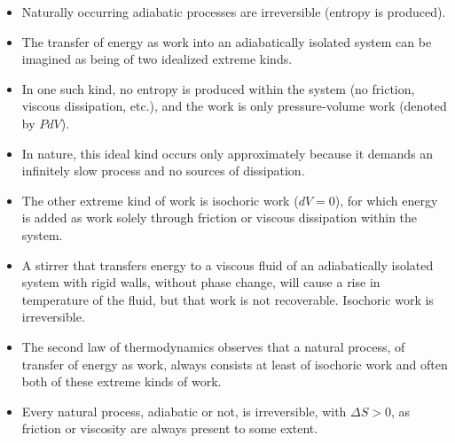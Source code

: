 \documentclass[]{article}
\begin{document}
\begin{itemize}
\item Naturally occurring adiabatic processes are irreversible (entropy is produced).
\item The transfer of energy as work into an adiabatically isolated system can be imagined as being of two idealized extreme kinds.
\item In one such kind, no entropy is produced within the system (no friction, viscous dissipation, etc.), and the work is only pressure-volume work (denoted by $P dV$). 
\item In nature, this ideal kind occurs only approximately because it demands an infinitely slow process and no sources of dissipation.
\item The other extreme kind of work is isochoric work ($dV = 0$), for which energy is added as work solely through friction or viscous dissipation within the system. 
\item A stirrer that transfers energy to a viscous fluid of an adiabatically isolated system with rigid walls, without phase change, will cause a rise in temperature of the fluid, but that work is not recoverable. Isochoric work is irreversible. 
\item The second law of thermodynamics observes that a natural process, of transfer of energy as work, always consists at least of isochoric work and often both of these extreme kinds of work.
\item  Every natural process, adiabatic or not, is irreversible, with $\Delta S > 0$, as friction or viscosity are always present to some extent. 
\end{itemize}
\end{document}
